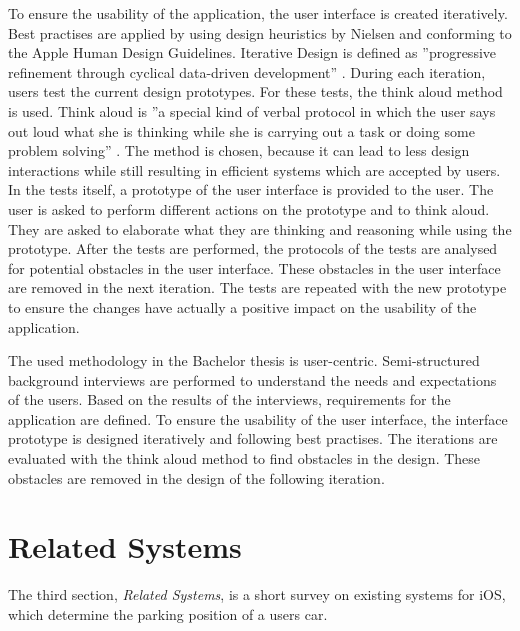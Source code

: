 To ensure the usability of the application, the user interface is created iteratively. Best practises are applied by using design heuristics by Nielsen and conforming to the Apple Human Design Guidelines. Iterative Design is defined as ''progressive refinement through cyclical data-driven development'' \cite{goodman2012observing}. During each iteration, users test the current design prototypes. For these tests, the think aloud method is used. Think aloud is ''a special kind of verbal protocol in which the user says out loud what she is thinking while she is carrying out a task or doing some problem solving'' \cite{nielsen1994usability}. The method is chosen, because it can lead to less design interactions while still resulting in efficient systems which are accepted by users. In the tests itself, a prototype of the user interface is provided to the user. The user is asked to perform different actions on the prototype and to think aloud. They are asked to elaborate what they are thinking and reasoning while using the prototype. After the tests are performed, the protocols of the tests are analysed for potential obstacles in the user interface. These obstacles in the user interface are removed in the next iteration. The tests are repeated with the new prototype to ensure the changes have actually a positive impact on the usability of the application. \cite{Abras2004} \cite{goodman2012observing} \cite{nielsen1994usability} \cite{heurisitcNielsen} \cite{apple:interfaceguidliines} \cite{jaspers2004think} 

The used methodology in the Bachelor thesis is user-centric. Semi-structured background interviews are performed to understand the needs and expectations of the users. Based on the results of the interviews, requirements for the application are defined. To ensure the usability of the user interface, the interface prototype is designed iteratively and following best practises. The iterations are evaluated with the think aloud method to find obstacles in the design. These obstacles are removed in the design of the following iteration. \cite{Abras2004} \cite{wilson2013interview} \cite{heurisitcNielsen} \cite{apple:interfaceguidliines}

\section{Related Systems}
The third section, \textit{Related Systems}, is a short survey on existing systems for iOS, which determine the parking position of a users car.


